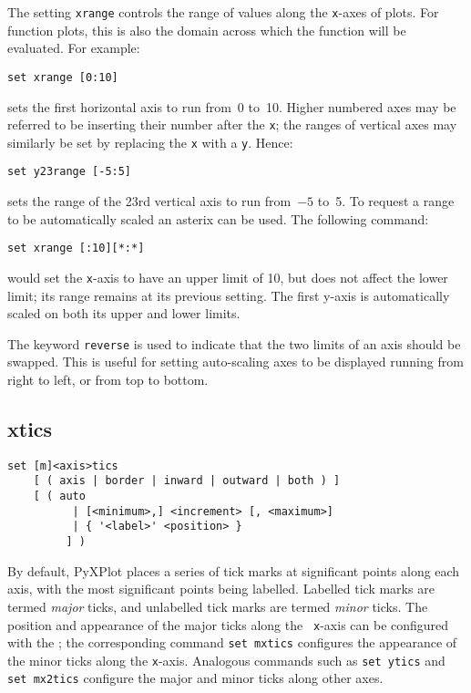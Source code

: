 The setting {\tt xrange} controls the range of values along the {\tt x}-axes of
plots.  For function plots, this is also the domain across which the function
will be evaluated.  For example:

\begin{verbatim}
set xrange [0:10]
\end{verbatim}

\noindent sets the first horizontal axis to run from~0 to~10.  Higher numbered
axes may be referred to be inserting their number after the {\tt x}; the ranges
of vertical axes may similarly be set by replacing the {\tt x} with a {\tt y}.
Hence:

\begin{verbatim}
set y23range [-5:5]
\end{verbatim}

\noindent sets the range of the 23rd vertical axis to run from~$-5$ to~5.  To
request a range to be automatically scaled an asterix can be used.  The
following command:

\begin{verbatim}
set xrange [:10][*:*]
\end{verbatim}

\noindent would set the {\tt x}-axis to have an upper limit of 10, but does not
affect the lower limit; its range remains at its previous setting.  The first
y-axis is automatically scaled on both its upper and lower limits.

The keyword {\tt reverse} is used to indicate that the two limits of an axis
should be swapped. This is useful for setting auto-scaling axes to be displayed
running from right to left, or from top to bottom.


\subsection{xtics}

\begin{verbatim}
set [m]<axis>tics
    [ ( axis | border | inward | outward | both ) ]
    [ ( auto
          | [<minimum>,] <increment> [, <maximum>]
          | { '<label>' <position> }
         ] )
\end{verbatim}

By default, PyXPlot places a series of tick marks at significant points along
each axis, with the most significant points being labelled.  Labelled tick
marks are termed {\it major} ticks, and unlabelled tick marks are termed {\it
minor} ticks.  The position and appearance of the major ticks along the {\tt
x}-axis can be configured with the ; the corresponding
command {\tt set mxtics} configures the appearance of the minor ticks along the
{\tt x}-axis. Analogous commands such as {\tt set ytics} and {\tt set mx2tics}
configure the major and minor ticks along other axes.

